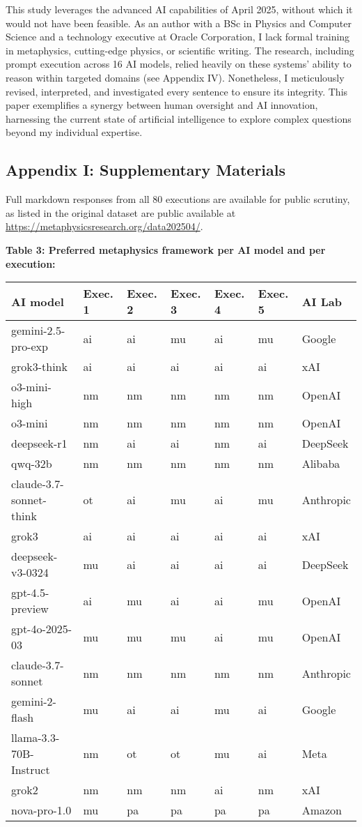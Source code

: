 This study leverages the advanced AI capabilities of April 2025, without
which it would not have been feasible. As an author with a BSc in
Physics and Computer Science and a technology executive at Oracle
Corporation, I lack formal training in metaphysics, cutting-edge
physics, or scientific writing. The research, including prompt execution
across 16 AI models, relied heavily on these systems' ability to reason
within targeted domains (see Appendix IV). Nonetheless, I meticulously
revised, interpreted, and investigated every sentence to ensure its
integrity. This paper exemplifies a synergy between human oversight and
AI innovation, harnessing the current state of artificial intelligence
to explore complex questions beyond my individual expertise.

\subsection{Appendix I: Supplementary
Materials}\label{appendix-i-supplementary-materials}

Full markdown responses from all 80 executions are available for public
scrutiny, as listed in the original dataset are public available at
\url{https://metaphysicsresearch.org/data202504/}.

\textbf{Table 3: Preferred metaphysics framework per AI model and per
execution:}

\begin{longtable}[]{@{}lllllll@{}}
\toprule\noalign{}
AI model & Exec. 1 & Exec. 2 & Exec. 3 & Exec. 4 & Exec. 5 & AI Lab \\
\midrule\noalign{}
\endhead
\bottomrule\noalign{}
\endlastfoot
gemini-2.5-pro-exp & ai & ai & mu & ai & mu & Google \\
grok3-think & ai & ai & ai & ai & ai & xAI \\
o3-mini-high & nm & nm & nm & nm & nm & OpenAI \\
o3-mini & nm & nm & nm & nm & nm & OpenAI \\
deepseek-r1 & nm & ai & ai & nm & ai & DeepSeek \\
qwq-32b & nm & nm & nm & nm & nm & Alibaba \\
claude-3.7-sonnet-think & ot & ai & mu & ai & mu & Anthropic \\
grok3 & ai & ai & ai & ai & ai & xAI \\
deepseek-v3-0324 & mu & ai & ai & ai & ai & DeepSeek \\
gpt-4.5-preview & ai & mu & ai & ai & mu & OpenAI \\
gpt-4o-2025-03 & mu & mu & mu & ai & mu & OpenAI \\
claude-3.7-sonnet & nm & nm & nm & nm & nm & Anthropic \\
gemini-2-flash & mu & ai & ai & mu & ai & Google \\
llama-3.3-70B-Instruct & nm & ot & ot & mu & ai & Meta \\
grok2 & nm & nm & nm & ai & nm & xAI \\
nova-pro-1.0 & mu & pa & pa & pa & pa & Amazon \\
\end{longtable}

